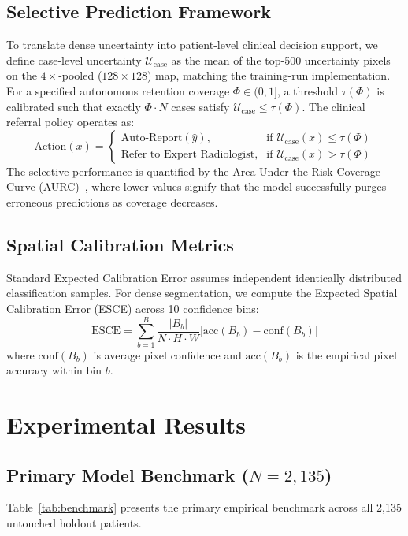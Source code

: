\documentclass[11pt,a4paper]{article}
\begin{document}
\subsection{Selective Prediction Framework}
To translate dense uncertainty into patient-level clinical decision support, we define case-level uncertainty $\mathcal{U}_{\text{case}}$ as the mean of the top-500 uncertainty pixels on the $4\times$-pooled ($128 \times 128$) map, matching the training-run implementation. For a specified autonomous retention coverage $\Phi \in (0, 1]$, a threshold $\tau(\Phi)$ is calibrated such that exactly $\Phi \cdot N$ cases satisfy $\mathcal{U}_{\text{case}} \le \tau(\Phi)$.
The clinical referral policy operates as:
\begin{equation}
    \text{Action}(x) = 
    \begin{cases} 
      \text{Auto-Report}(\hat{y}), & \text{if } \mathcal{U}_{\text{case}}(x) \le \tau(\Phi) \\
      \text{Refer to Expert Radiologist}, & \text{if } \mathcal{U}_{\text{case}}(x) > \tau(\Phi)
    \end{cases}
\end{equation}
The selective performance is quantified by the Area Under the Risk-Coverage Curve (AURC)~\cite{geifman2017selective}, where lower values signify that the model successfully purges erroneous predictions as coverage decreases.

\subsection{Spatial Calibration Metrics}
Standard Expected Calibration Error assumes independent identically distributed classification samples. For dense segmentation, we compute the Expected Spatial Calibration Error (ESCE) across 10 confidence bins:
\begin{equation}
    \text{ESCE} = \sum_{b=1}^{B} \frac{|B_b|}{N \cdot H \cdot W} \left| \text{acc}(B_b) - \text{conf}(B_b) \right|
\end{equation}
where $\text{conf}(B_b)$ is average pixel confidence and $\text{acc}(B_b)$ is the empirical pixel accuracy within bin $b$.

\section{Experimental Results}
\label{sec:results}

\subsection{Primary Model Benchmark ($N=2,135$)}
Table~\ref{tab:benchmark} presents the primary empirical benchmark across all 2,135 untouched holdout patients.
\end{document}
